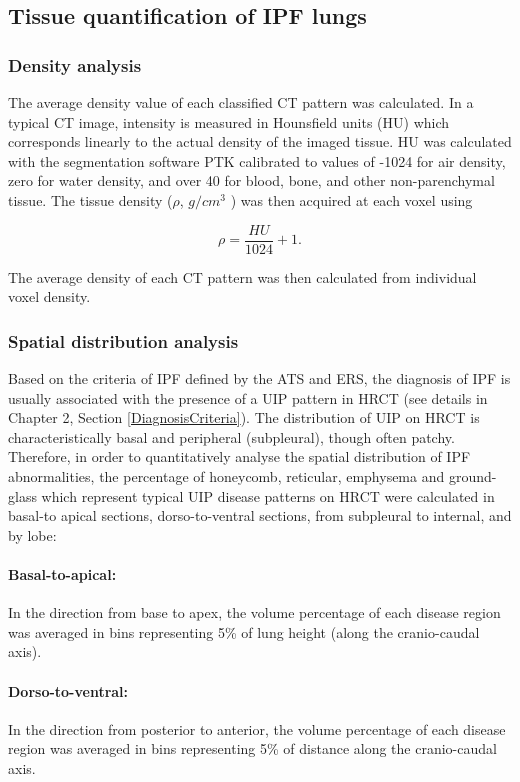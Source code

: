 \subsection{Tissue quantification of IPF lungs} \label{TissueQuantification}
\subsubsection{Density analysis}
The average density value of each classified CT pattern was calculated. In a typical CT image, intensity is measured in Hounsfield units (HU) which corresponds linearly to the actual density of the imaged tissue. HU was calculated with the segmentation software PTK calibrated to values of -1024 for air density, zero for water density, and over 40 for blood, bone, and other non-parenchymal tissue. The tissue density ($\rho$, $g/cm^3$ ) was then acquired at each voxel using

\begin{equation}
\rho = \frac{HU}{1024} + 1.
\end{equation}

The average density of each CT pattern was then calculated from individual voxel density.

\subsubsection{Spatial distribution analysis}
Based on the criteria of IPF defined by the ATS and ERS, the diagnosis of IPF is usually associated with the presence of a UIP pattern in HRCT (see details in Chapter 2, Section \ref{DiagnosisCriteria}). The distribution of UIP on HRCT is characteristically basal and peripheral (subpleural), though often patchy. Therefore, in order to quantitatively analyse the spatial distribution of IPF abnormalities, the percentage of honeycomb, reticular, emphysema and ground-glass which represent typical UIP disease patterns on HRCT were calculated in basal-to apical sections, dorso-to-ventral sections, from subpleural to internal, and by lobe: 
\newpage

\paragraph{Basal-to-apical:} In the direction from base to apex, the volume percentage of each disease region was averaged in bins representing 5\% of lung height (along the cranio-caudal axis). 

\paragraph{Dorso-to-ventral:} In the direction from posterior to anterior, the volume percentage of each disease region was averaged in bins representing 5\% of distance along the cranio-caudal axis. 

